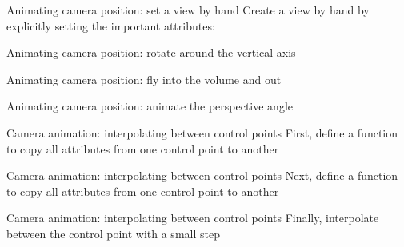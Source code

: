 \begin{frame}{Animating camera position: set a view by hand}
  Create a view by hand by explicitly setting the important attributes:
  
\end{frame}

\begin{frame}{Animating camera position: rotate around the vertical axis}
  
\end{frame}

\begin{frame}{Animating camera position: fly into the volume and out}
  
\end{frame}

\begin{frame}{Animating camera position: animate the perspective angle}
  
\end{frame}

\begin{frame}{Camera animation: interpolating between control points}
  First, define a function to copy all attributes from one control point to another
  
\end{frame}

\begin{frame}{Camera animation: interpolating between control points}
  Next, define a function to copy all attributes from one control point to another
  
\end{frame}

\begin{frame}{Camera animation: interpolating between control points}
  Finally, interpolate between the control point with a small step
  
\end{frame}

